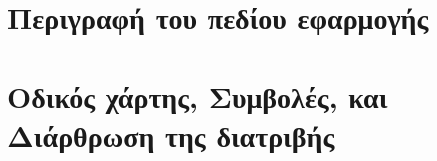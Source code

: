 \chapter{Περιγραφή του πεδίου εφαρμογής}


\chapter{Οδικός χάρτης, Συμβολές, και Διάρθρωση της διατριβής}

